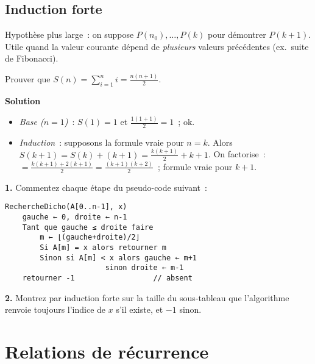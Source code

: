 \subsection{Induction forte}
Hypothèse plus large : on suppose $P(n_0),\ldots,P(k)$ pour démontrer $P(k+1)$.
Utile quand la valeur courante dépend de \emph{plusieurs} valeurs précédentes
(ex. suite de Fibonacci).

\begin{exercice}
Prouver que $S(n)=\sum_{i=1}^{n} i = \frac{n(n+1)}{2}$.
\end{exercice}
\textbf{Solution}
\begin{itemize}
  \item \emph{Base ($n=1$)} : $S(1)=1$ et $\tfrac{1(1+1)}{2}=1$ ; ok.
  \item \emph{Induction} : supposons la formule vraie pour $n=k$.
        Alors $S(k+1)=S(k)+(k+1)=\frac{k(k+1)}{2}+k+1$.
        On factorise : $=\frac{k(k+1)+2(k+1)}{2}=\frac{(k+1)(k+2)}{2}$ ;
        formule vraie pour $k+1$. %
\end{itemize}

\begin{exercice}
\leavevmode\par
\textbf{1.} Commentez chaque étape du pseudo-code suivant :
\begin{lstlisting}[mathescape=true]
RechercheDicho(A[0..n-1], x)
    gauche ← 0, droite ← n-1
    Tant que gauche ≤ droite faire
        m ← ⌊(gauche+droite)/2⌋
        Si A[m] = x alors retourner m
        Sinon si A[m] < x alors gauche ← m+1
                       sinon droite ← m-1
    retourner -1                  // absent
\end{lstlisting}
\textbf{2.} Montrez par induction forte sur la taille du sous‑tableau que
l’algorithme renvoie toujours l’indice de \(x\) s’il existe, et $-1$ sinon.
\end{exercice}

\section{Relations de récurrence}

